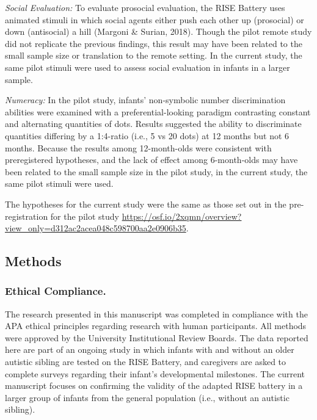 \documentclass[
  english,
  man,floatsintext]{apa6}
\begin{document}
\emph{Social Evaluation:} To evaluate prosocial evaluation, the RISE Battery uses animated stimuli in which social agents either push each other up (prosocial) or down (antisocial) a hill (Margoni \& Surian, 2018).
Though the pilot remote study did not replicate the previous findings, this result may have been related to the small sample size or translation to the remote setting.
In the current study, the same pilot stimuli were used to assess social evaluation in infants in a larger sample.

\emph{Numeracy:} In the pilot study, infants' non-symbolic number discrimination abilities were examined with a preferential-looking paradigm contrasting constant and alternating quantities of dots.
Results suggested the ability to discriminate quantities differing by a 1:4-ratio (i.e., 5 vs 20 dots) at 12 months but not 6 months.
Because the results among 12-month-olds were consistent with preregistered hypotheses, and the lack of effect among 6-month-olds may have been related to the small sample size in the pilot study, in the current study, the same pilot stimuli were used.

The hypotheses for the current study were the same as those set out in the pre-registration for the pilot study \url{https://osf.io/2xqmn/overview?view_only=d312ac2acea048c598700aa2e0906b35}.

\subsection{Methods}\label{methods}

\subsubsection{Ethical Compliance.}\label{ethical-compliance.}

The research presented in this manuscript was completed in compliance with the APA ethical principles regarding research with human participants.
All methods were approved by the University Institutional Review Boards.
The data reported here are part of an ongoing study in which infants with and without an older autistic sibling are tested on the RISE Battery, and caregivers are asked to complete surveys regarding their infant's developmental milestones.
The current manuscript focuses on confirming the validity of the adapted RISE battery in a larger group of infants from the general population (i.e., without an autistic sibling).
\end{document}
